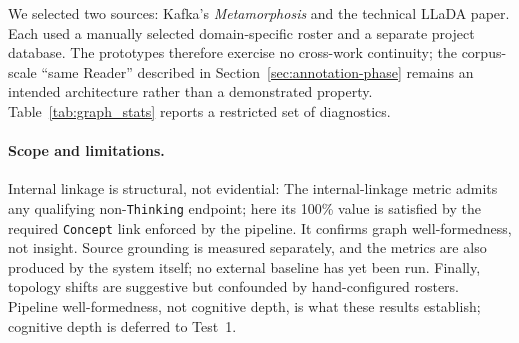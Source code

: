 We selected two sources: Kafka's \emph{Metamorphosis} and the technical LLaDA
paper. Each used a manually selected domain-specific roster and a separate
project database. The prototypes therefore exercise no cross-work continuity;
the corpus-scale ``same Reader'' described in
Section~\ref{sec:annotation-phase} remains an intended architecture rather than
a demonstrated property. Table~\ref{tab:graph_stats} reports a restricted set
of diagnostics.

\paragraph{Scope and limitations.} Internal linkage is structural, not evidential:
The internal-linkage metric admits any qualifying non-\texttt{Thinking} endpoint; here its 100\% value is satisfied by the required \texttt{Concept} link enforced by the pipeline.
It confirms graph well-formedness, not insight. Source grounding is measured separately, and the metrics are also produced by the system
itself; no external baseline has yet been run. Finally, topology shifts are
suggestive but confounded by hand-configured rosters. Pipeline well-formedness,
not cognitive depth, is what these results establish; cognitive depth is
deferred to Test~1.


